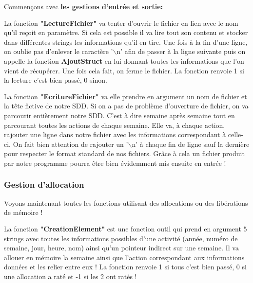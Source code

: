 \documentclass[12pt,french]{article} %
\begin{document}
Commençons avec \textbf{les gestions d'entrée et sortie:}\newline

La fonction \textbf{"LectureFichier"} va tenter d'ouvrir le fichier en lien avec le nom qu'il reçoit en paramètre. Si cela est possible il va lire tout son contenu et stocker dans différentes strings les informations qu'il en tire. Une fois à la fin d'une ligne, on oublie pas d'enlever le caractère '$\backslash$n' afin de passer à la ligne suivante puis on appelle la fonction \textbf{AjoutStruct} en lui donnant toutes les informations que l'on vient de récupérer. Une fois cela fait, on ferme le fichier. La fonction renvoie 1 si la lecture c'est bien passé, 0 sinon.\newline

La fonction \textbf{"EcritureFichier"} va elle prendre en argument un nom de fichier et la tête fictive de notre SDD. Si on a pas de problème d'ouverture de fichier, on va parcourir entièrement notre SDD. C'est à dire semaine après semaine tout en parcourant toutes les actions de chaque semaine. Elle va, à chaque action, rajouter une ligne dans notre fichier avec les informations correspondant à celle-ci. On fait bien attention de rajouter un '$\backslash$n' à chaque fin de ligne sauf la dernière pour respecter le format standard de nos fichiers. Grâce à cela un fichier produit par notre programme pourra être bien évidemment mis ensuite en entrée !

\subsubsection{Gestion d'allocation}

Voyons maintenant toutes les fonctions utilisant des allocations ou des libérations de mémoire !\newline

La fonction \textbf{"CreationElement"} est une fonction outil qui prend en argument 5 strings avec toutes les informations possibles d'une activité (année, numéro de semaine, jour, heure, nom) ainsi qu'un pointeur indirect sur une semaine. Il va allouer en mémoire la semaine ainsi que l'action correspondant aux informations données et les relier entre eux ! 
La fonction renvoie 1 si tous c'est bien passé, 0 si une allocation a raté et -1 si les 2 ont ratés !\newline
\end{document}
